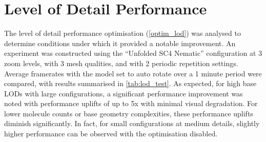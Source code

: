 \section{Level of Detail Performance}
\label{lod_analysis_section}

The level of detail performance optimisation (\cref{optim_lod}) was analysed to determine conditions under which it provided a notable improvement. An experiment was constructed using the ``Unfolded SC4 Nematic'' configuration at 3 zoom levels, with 3 mesh qualities, and with 2 periodic repetition settings. Average framerates with the model set to auto rotate over a 1 minute period were compared, with results summarised in \cref{tab:lod_test}. As expected, for high base LODs with large configurations, a significant performance improvement was noted with performance uplifts of up to 5x with minimal visual degradation. For lower molecule counts or base geometry complexities, these performance uplifts diminish significantly. In fact, for small configurations at medium details, slightly higher performance can be observed with the optimisation disabled.

